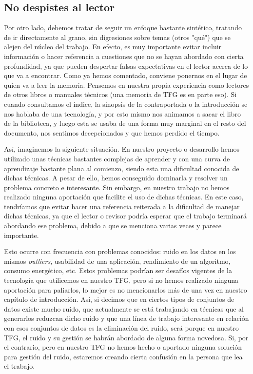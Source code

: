 \subsection{No despistes al lector}
Por otro lado, debemos tratar de seguir un enfoque bastante sintético, tratando de ir directamente al grano, sin digresiones sobre temas (otros "qué") que  se alejen del núcleo del trabajo. En efecto, es muy importante evitar incluir información o hacer referencia a cuestiones que no se hayan abordado con cierta profundidad, ya que pueden despertar falsas expectativas en el lector acerca de lo que va a encontrar. Como ya hemos comentado, conviene ponernos en el lugar de quien va a leer la memoria. Pensemos en nuestra propia experiencia como lectores de otros libros o manuales técnicos (una memoria de TFG es en parte eso). Si cuando consultamos el índice, la sinopsis de la contraportada o la introducción se nos hablaba de una tecnología, y por esto mismo nos animamos a sacar el libro de la biblioteca, y luego esta se usaba de una forma muy marginal en el resto del documento, nos sentimos decepcionados y que hemos perdido el tiempo.

Así, imaginemos la siguiente situación. En nuestro proyecto o desarrollo hemos utilizado unas técnicas bastantes complejas de aprender y con una curva de aprendizaje bastante plana al comienzo, siendo esta una dificultad conocida de dichas técnicas. A pesar de ello, hemos conseguido dominarla y resolver un problema concreto e interesante. Sin embargo, en nuestro trabajo no hemos realizado ninguna aportación que facilite el uso de dichas técnicas. En este caso, tendríamos que evitar hacer una referencia reiterada a la dificultad de manejar dichas técnicas, ya que el lector o revisor podría esperar que el trabajo terminará abordando ese problema, debido a que  se menciona varias veces y parece importante.

Esto ocurre con frecuencia con problemas conocidos: ruido en los datos en los mismos \textit{outliers}, usabilidad de una aplicación, rendimiento de un algoritmo, consumo energético, etc. Estos problemas podrían ser desafíos vigentes de la tecnología que utilicemos en nuestro TFG, pero si no hemos realizado ninguna aportación para paliarlos, lo mejor es no mencionarlos más de una vez en nuestro capítulo de introducción. Así, si decimos que en ciertos tipos de conjuntos de datos existe mucho ruido, que actualmente se está trabajando en técnicas que al generarlos reduzcan dicho ruido y que una línea de trabajo interesante en relación con esos conjuntos de datos es la eliminación del ruido, será porque en nuestro TFG, el ruido y su gestión se habrán abordado de alguna forma novedosa. Si, por el contrario, pero en nuestro TFG no hemos hecho o aportado ninguna solución para gestión del ruido, estaremos creando cierta confusión en la persona que lea el trabajo.

